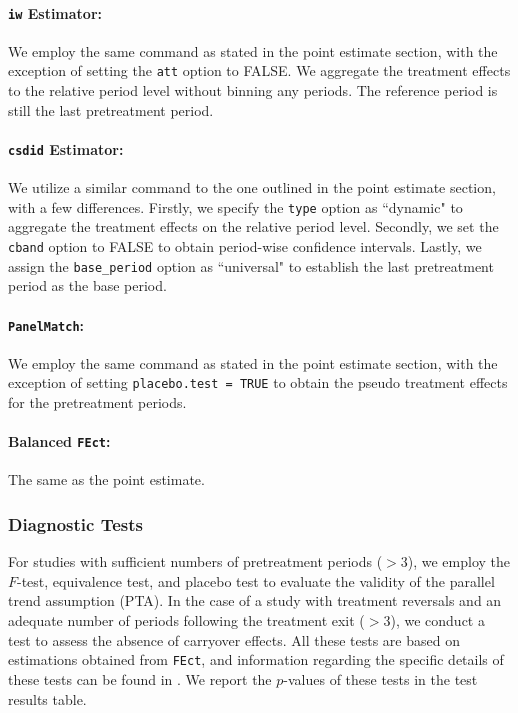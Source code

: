 \documentclass[12pt]{article}
\begin{document}
\paragraph*{\texttt{iw} Estimator:} We employ the same command as stated in the point estimate section, with the exception of setting the \texttt{att} option to FALSE. We aggregate the treatment effects to the relative period level without binning any periods. The reference period is still the last pretreatment period.

\paragraph*{\texttt{csdid} Estimator:} We utilize a similar command to the one outlined in the point estimate section, with a few differences. Firstly, we specify the \texttt{type} option as ``dynamic" to aggregate the treatment effects on the relative period level. Secondly, we set the \texttt{cband} option to FALSE to obtain period-wise confidence intervals. Lastly, we assign the \texttt{base\_period} option as ``universal" to establish the last pretreatment period as the base period.

\paragraph*{\texttt{PanelMatch}:} We employ the same command as stated in the point estimate section, with the exception of setting \texttt{placebo.test = TRUE} to obtain the pseudo treatment effects for the pretreatment periods.

\paragraph*{Balanced \texttt{FEct}:} The same as the point estimate.

\subsubsection{Diagnostic Tests}

For studies with sufficient numbers of pretreatment periods ($>3$), we employ the $F$-test, equivalence test, and placebo test to evaluate the validity of the parallel trend assumption (PTA). In the case of a study with treatment reversals and an adequate number of periods following the treatment exit ($>3$), we conduct a test to assess the absence of carryover effects. All these tests are based on estimations obtained from \texttt{FEct}, and information regarding the specific details of these tests can be found in \citet{LWX2022}. We report the $p$-values of these tests in the test results table. 
\end{document}
